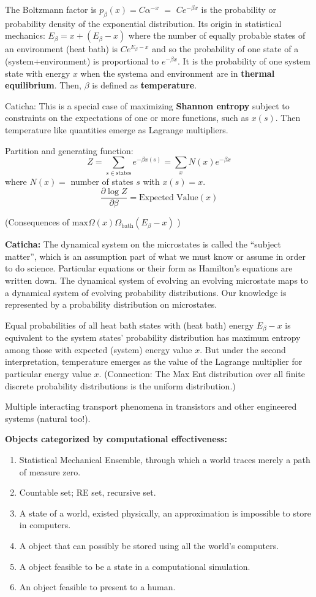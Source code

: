 \documentclass{article}
\begin{document}
The Boltzmann factor is 
$p_{\beta}(x)= C\alpha^{-x}$ $=$ $Ce^{-\beta x}$ is the probability 
or probability density of the exponential distribution.
Its origin in statistical mechanics:  $E_\beta = x + (E_\beta-x)$ where the 
number of equally probable states of an environment (heat bath) 
is $Ce^{E_\beta - x}$ and so the probability of one state of a 
(system+environment) is proportional to $e^{-\beta x}$.  It is the probability
of one system state with energy $x$ when the systema and environment are
in \textbf{thermal equilibrium}.  Then, $\beta$ is defined as 
\textbf{temperature}.

Caticha: This is a special case of maximizing \textbf{Shannon entropy}
subject to constraints on the expectations of one or more functions, such as 
$x(s)$.  Then temperature like quantities emerge as Lagrange multipliers.

Partition and generating function:
\[
Z = \sum_{s\in\text{states}}e^{-\beta x(s)} = \sum_{x}N(x)e^{-\beta x} 
\]
where $N(x)= $ number of states $s$ with $x(s) = x$.
\[
\frac{\partial{\log Z}}{\partial\beta}
=
\text{Expected Value}(x)
\]

(Consequences of $\text{max}\Omega(x)\Omega_{\text{bath}}(E_\beta -x )$
\cite{CatichaEIFP})

\textbf{Caticha:} The dynamical system on the microstates is called
the ``subject matter'', which is an assumption part of what we must know or 
assume
in order to do science.  Particular equations or their form as
Hamilton's equations are written down.
The dynamical system of evolving an evolving 
microstate maps to a dynamical system of evolving probability 
distributions.  Our knowledge is represented by a probability distribution
on microstates.  

Equal probabilities of all heat bath states with (heat bath) energy 
$E_\beta -x$ is 
equivalent to the system states' probability distribution has maximum
entropy among those with expected (system) energy value $x$.  But under the
second interpretation, temperature emerges as the value of the Lagrange 
multiplier for particular energy value $x$.  (Connection: The Max Ent
distribution over all finite discrete probability distributions is the uniform
distribution.)  



Multiple interacting transport phenomena in transistors and other 
engineered systems (natural too!).
 
\textbf{Objects categorized by computational effectiveness:}
\begin{enumerate}
\item Statistical Mechanical Ensemble, through which a world traces
merely a path of measure zero.
\item Countable set; RE set, recursive set.
\item A state of a world, existed physically, an approximation is 
impossible to store in computers.
\item A object that can possibly be stored using all the world's 
computers.
\item A object feasible to be a state in a computational simulation.
\item An object feasible to present to a human.
\end{enumerate}
\end{document}
